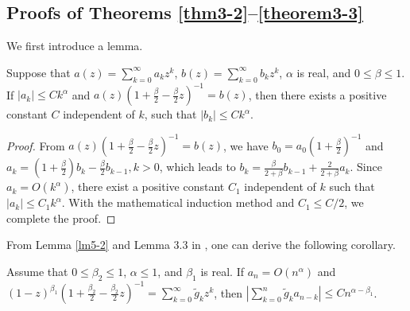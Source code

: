 \documentclass[10pt]{siamltex}
\newcommand{\abs}[1]{\left\vert#1\right\vert}
\begin{document}
\subsection{Proofs of Theorems \ref{thm3-2}--\ref{theorem3-3}}
We first introduce a lemma.
\begin{lemma}\label{lm5-2}
Suppose that $a(z)=\sum_{k=0}^{\infty}a_kz^k$, $b(z)=\sum_{k=0}^{\infty}b_kz^k$, $\alpha$ is real,
 and $0\leq \beta\leq 1$.
If $\abs{a_k}\leq Ck^{\alpha}$ and $a(z)\left(1+\frac{\beta}{2}-\frac{\beta}{2}z\right)^{-1}=b(z)$,
then there exists a positive constant  $C$ independent of $k$, such that $|b_k|\leq C k^{\alpha}$.
\end{lemma}
\begin{proof}
From $a(z)\left(1+\frac{\beta}{2}-\frac{\beta}{2}z\right)^{-1}=b(z)$, we have
$b_0=a_0\left(1+\frac{\beta}{2}\right)^{-1}$ and
$a_k=\left(1+\frac{\beta}{2}\right)b_{k}-\frac{\beta}{2}b_{k-1},k>0$, which leads to
$b_k=\frac{\beta}{2+\beta}b_{k-1}+\frac{2}{2+\beta}a_k$.
Since $a_k=O(k^{\alpha})$, there exist a positive constant $C_1$ independent of $k$ such that
$|a_k|\leq C_1k^{\alpha}$. With the mathematical induction method
and $C_1\leq C/2$, we   complete  the proof.
\iffalse
Assume that there exists a positive constant $C$ independent of
$k$ such that $|b_k|\leq C k^{\alpha},k=1,2,...,n$, $C\geq 2C_1$. Next, we prove
$|b_{n+1}|\leq C (n+1)^{\alpha}$.
From \eqref{s4:eq-5} and the assumption, we have
\begin{equation}\label{s4:eq-6}\begin{aligned}
|b_{n+1}|\leq &\frac{\beta}{2+\beta}|b_{n}|+\frac{2}{2+\beta}|a_{n+1}|
\leq  \frac{\beta}{2+\beta}Cn^{\alpha}+\frac{2}{2+\beta}C_1(n+1)^{\alpha}\\
\leq &\frac{C\beta}{2+\beta}2(n+1)^{\alpha}+\frac{2}{2+\beta}C_1(n+1)^{\alpha}
\leq\frac{C(2\beta+1)}{2+\beta}(n+1)^{\alpha}\\
\leq& C(n+1)^{\alpha},
\end{aligned}\end{equation}
where we have used  $C_1\leq \frac{1}{2}C$, $0\leq \beta\leq 1$,
and $n^{\alpha} \leq 2(n+1)^{\alpha}$ for $n\geq 1,  \alpha \in \mathbb{R}$.
The proof is completed.
\fi
\end{proof}

From Lemma \ref{lm5-2} and Lemma 3.3 in \cite{ZengLLT15}, one can   derive the following corollary.
\begin{corollary}\label{crlr5-3}
Assume that $0\leq \beta_2\leq 1$, $\alpha\leq 1$, and $\beta_1$ is real.
If $a_n=O(n^{\alpha})$ and
 $(1-z)^{\beta_1}\left(1+\frac{\beta_2}{2}-\frac{\beta_2}{2}z\right)^{-1}
=\sum_{k=0}^{\infty}\tilde{g}_kz^k$,
then $\abs{\sum_{k=0}^n\tilde{g}_ka_{n-k}}\leq C n^{\alpha-\beta_1}$.
\end{corollary}
\end{document}
